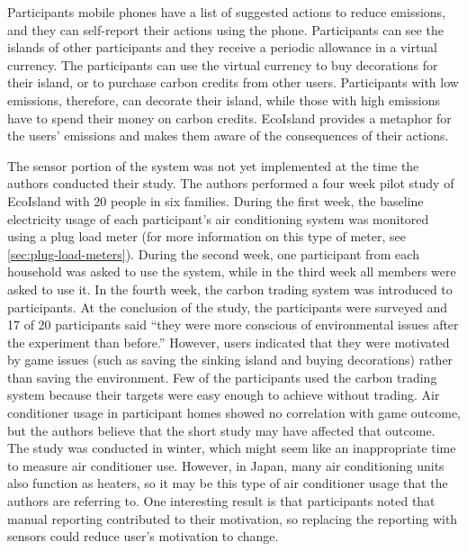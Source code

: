 Participants mobile phones have a list of suggested actions to reduce emissions, and they can self-report their actions using the phone. Participants can see the islands of other participants and they receive a periodic allowance in a virtual currency. The participants can use the virtual currency to buy decorations for their island, or to purchase carbon credits from other users. Participants with low emissions, therefore, can decorate their island, while those with high emissions have to spend their money on carbon credits. EcoIsland provides a metaphor for the users' emissions and makes them aware of the consequences of their actions.

The sensor portion of the system was not yet implemented at the time the authors conducted their study. The authors performed a four week pilot study of EcoIsland with 20 people in six families. During the first week, the baseline electricity usage of each participant's air conditioning system was monitored using a plug load meter (for more information on this type of meter, see \autoref{sec:plug-load-meters}). During the second week, one participant from each household was asked to use the system, while in the third week all members were asked to use it. In the fourth week, the carbon trading system was introduced to participants. At the conclusion of the study, the participants were surveyed and 17 of 20 participants said ``they were more conscious of environmental issues after the experiment than before.'' However, users indicated that they were motivated by game issues (such as saving the sinking island and buying decorations) rather than saving the environment. Few of the participants used the carbon trading system because their targets were easy enough to achieve without trading. Air conditioner usage in participant homes showed no correlation with game outcome, but the authors believe that the short study may have affected that outcome. The study was conducted in winter, which might seem like an inappropriate time to measure air conditioner use. However, in Japan, many air conditioning units also function as heaters, so it may be this type of air conditioner usage that the authors are referring to. One interesting result is that participants noted that manual reporting contributed to their motivation, so replacing the reporting with sensors could reduce user's motivation to change.